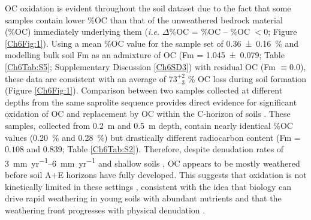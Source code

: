 OC oxidation is evident throughout the soil dataset due to the fact that some samples contain lower \%OC than that of the unweathered bedrock material (\%OC) immediately underlying them (\textit{i.e.} $\Delta$\%OC = \%OC -- \%OC $< 0$; Figure \ref{Ch6Fig:1}). Using a mean \%OC value for the sample set of \SI{0.36 \pm 0.16}{\%} and modelling bulk soil Fm as an admixture of OC (Fm = \num{1.045 \pm 0.079}; Table \ref{Ch6Tab:S5}; Supplementary Discussion \ref{Ch6SD3}) with residual OC (Fm $\equiv 0.0$), these data are consistent with an average of $73^{+2}_{-3}$ \% OC loss during soil formation (Figure \ref{Ch6Fig:1}). Comparison between two samples collected at different depths from the same saprolite sequence provides direct evidence for significant oxidation of OC and replacement by OC within the C-horizon of soils \citep{Hilton:2013kq}. These samples, collected from \SI{0.2}{m} and \SI{0.5}{m} depth, contain nearly identical \%OC values (\SI{0.20}{\%} and \SI{0.28}{\%}) but drastically different radiocarbon content (Fm = $0.108$ and $0.839$; Table \ref{Ch6Tab:S2}). Therefore, despite denudation rates of \SIrange{3}{6}{mm.yr^{-1}} \citep{Dadson:2003kl} and shallow soils \citep[\SI{\leq 0.8}{m};][]{Tsai:2001vp}, OC appears to be mostly weathered before soil A+E horizons have fully developed. This suggests that oxidation is not kinetically limited in these settings \citep[\textit{c.f.}][]{Chang:1999vo,Petsch:2001eq}, consistent with the idea that biology can drive rapid weathering in young soils with abundant nutrients and that the weathering front progresses with physical denudation \citep{Brantley:2011ku}.


